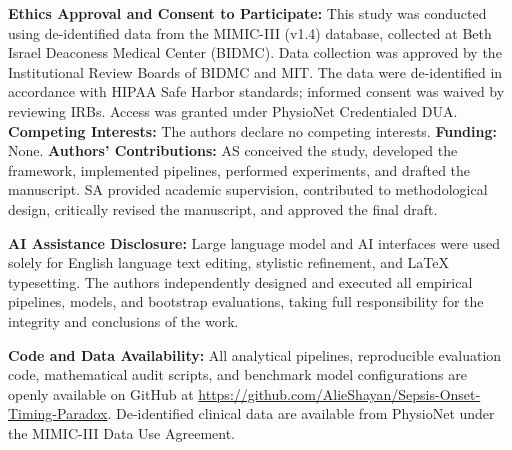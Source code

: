 \documentclass[10pt,twocolumn,a4paper]{article}
\begin{document}
\vfill\break
{\fontsize{5.8pt}{6.8pt}\selectfont
\noindent\textbf{Ethics Approval and Consent to Participate:} This study was conducted using de-identified data from the MIMIC-III (v1.4) database, collected at Beth Israel Deaconess Medical Center (BIDMC). Data collection was approved by the Institutional Review Boards of BIDMC and MIT. The data were de-identified in accordance with HIPAA Safe Harbor standards; informed consent was waived by reviewing IRBs. Access was granted under PhysioNet Credentialed DUA. \textbf{Competing Interests:} The authors declare no competing interests. \quad \textbf{Funding:} None. \quad \textbf{Authors' Contributions:} AS conceived the study, developed the framework, implemented pipelines, performed experiments, and drafted the manuscript. SA provided academic supervision, contributed to methodological design, critically revised the manuscript, and approved the final draft.

\vspace{0.15em}
\noindent\textbf{AI Assistance Disclosure:} Large language model and AI interfaces were used solely for English language text editing, stylistic refinement, and LaTeX typesetting. The authors independently designed and executed all empirical pipelines, models, and bootstrap evaluations, taking full responsibility for the integrity and conclusions of the work.

\vspace{0.15em}
\noindent\textbf{Code and Data Availability:} All analytical pipelines, reproducible evaluation code, mathematical audit scripts, and benchmark model configurations are openly available on GitHub at \url{https://github.com/AlieShayan/Sepsis-Onset-Timing-Paradox}. De-identified clinical data are available from PhysioNet under the MIMIC-III Data Use Agreement.
}
\end{document}
